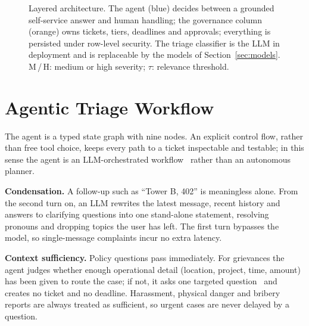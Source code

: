\documentclass[conference]{IEEEtran}
\begin{document}
\begin{figure}[t]
{}%
\caption{Layered architecture. The agent (blue) decides between a grounded self-service answer and human handling;
the governance column (orange) owns tickets, tiers, deadlines and approvals; everything is persisted under
row-level security. The triage classifier is the LLM in deployment and is replaceable by the models of
Section~\ref{sec:models}. M\,/\,H: medium or high severity; $\tau$: relevance threshold.}
\label{fig:arch}
\end{figure}

\section{Agentic Triage Workflow}
\label{sec:agent}

The agent is a typed state graph with nine nodes. An explicit control
flow, rather than free tool choice, keeps every path to a ticket inspectable and testable; in
this sense the agent is an LLM-orchestrated workflow~\cite{easin2024langgraph} rather than an autonomous planner.

\textbf{Condensation.} A follow-up such as ``Tower B, 402'' is meaningless alone. From the second turn on, an LLM
rewrites the latest message, recent history and answers to clarifying questions into one stand-alone
statement, resolving pronouns and dropping topics the user has left. The first turn
bypasses the model, so single-message complaints incur no extra latency.

\textbf{Context sufficiency.} Policy questions pass immediately. For grievances the agent judges whether enough
operational detail (location, project, time, amount) has been given to route the case; if not, it asks one
targeted question~\cite{putro2025energyrag} and creates no ticket and no deadline.
Harassment, physical danger and bribery reports are always treated as sufficient, so urgent cases are never delayed
by a question.
\end{document}
